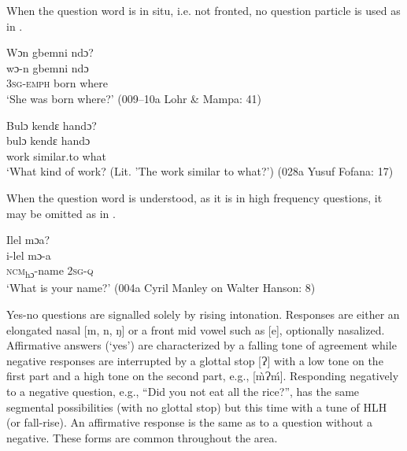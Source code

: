 When the question word is in situ, i.e. not fronted, no question particle is used as in .

\ea%
    \label{ex:222}
    \ea Wɔn gbemni ndɔ?\\
    \gll wɔ-n      gbemni    ndɔ\\
    \textsc{3sg-emph}   born      where\\
    \glt ‘She was born where?' (009--10a Lohr \& Mampa: 41)

    \ex Bulɔ kendɛ handɔ?\\
    \gll bulɔ    kendɛ      handɔ\\
    work    similar.to  what\\
    \glt ‘What kind of work? (Lit. 'The work similar to what?') (028a Yusuf Fofana: 17)
\z
\z

When the question word is understood, as it is in high frequency questions, it may be omitted as in .

\ea%
    \label{ex:223}
    Ilel mɔa?\\
    \gll i-lel        mɔ-a\\
    \textsc{ncm}\textsubscript{hɔ}{}-name  \textsc{2sg}{}-\textsc{q}\\
    \glt ‘What is your name?' (004a Cyril Manley on Walter Hanson: 8)\\
\z

Yes-no questions are signalled solely by rising intonation. Responses are either an elongated nasal [m, n, ŋ] or a front mid vowel such as [e], optionally nasalized. Affirmative answers (‘yes') are characterized by a falling tone of agreement while negative responses are interrupted by a glottal stop [Ɂ] with a low tone on the first part and a high tone on the second part, e.g., [\`{m}Ɂḿ]. Responding negatively to a negative question, e.g., “Did you not eat all the rice?”, has the same segmental possibilities (with no glottal stop) but this time with a tune of HLH (or fall-rise). An affirmative response is the same as to a question without a negative. These forms are common throughout the area.

